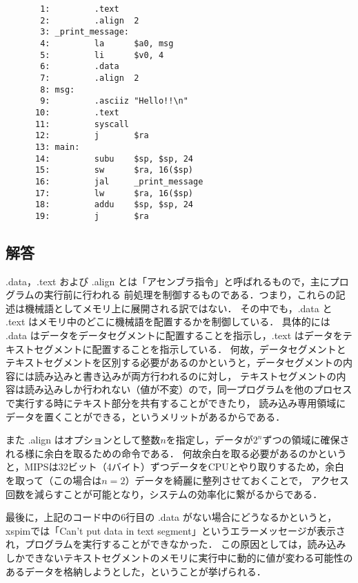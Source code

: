 \documentclass[a4j,11pt]{jarticle}
\begin{document}
\begin{verbatim}
       1:         .text
       2:         .align  2
       3: _print_message:
       4:         la      $a0, msg
       5:         li      $v0, 4
       6:         .data
       7:         .align  2
       8: msg:
       9:         .asciiz "Hello!!\n"
      10:         .text
      11:         syscall
      12:         j       $ra
      13: main:
      14:         subu    $sp, $sp, 24
      15:         sw      $ra, 16($sp)
      16:         jal     _print_message
      17:         lw      $ra, 16($sp)
      18:         addu    $sp, $sp, 24
      19:         j       $ra
\end{verbatim}

\subsection{解答}

.data，.text および .align とは「アセンブラ指令」と呼ばれるもので，主にプログラムの実行前に行われる
前処理を制御するものである．つまり，これらの記述は機械語としてメモリ上に展開される訳ではない．
その中でも，.data と .text はメモリ中のどこに機械語を配置するかを制御している．
具体的には .data はデータをデータセグメントに配置することを指示し，.text はデータをテキストセグメントに配置することを指示している．
何故，データセグメントとテキストセグメントを区別する必要があるのかというと，データセグメントの内容には読み込みと書き込みが両方行われるのに対し，
テキストセグメントの内容は読み込みしか行われない（値が不変）ので，同一プログラムを他のプロセスで実行する時にテキスト部分を共有することができたり，
読み込み専用領域にデータを置くことができる，というメリットがあるからである．

また .align はオプションとして整数$n$を指定し，データが$2^{n}$ずつの領域に確保される様に余白を取るための命令である．
何故余白を取る必要があるのかというと，MIPSは32ビット（4バイト）ずつデータをCPUとやり取りするため，余白を取って（この場合は$n = 2$）データを綺麗に整列させておくことで，
アクセス回数を減らすことが可能となり，システムの効率化に繋がるからである．

最後に，上記のコード中の6行目の .data がない場合にどうなるかというと，xspimでは「Can't put data in text segment」というエラーメッセージが表示され，プログラムを実行することができなかった．
この原因としては，読み込みしかできないテキストセグメントのメモリに実行中に動的に値が変わる可能性のあるデータを格納しようとした，ということが挙げられる．

\end{document}
